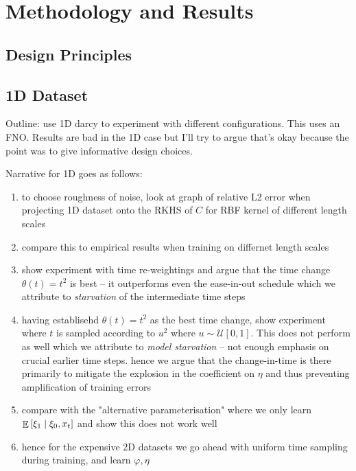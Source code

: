 \chapter{Methodology and Results}\label{cha:4}

\ifpdf
\graphicspath{{Chapter4/Figs/Raster/}{Chapter4/Figs/PDF/}{Chapter4/Figs/}}
\else
\graphicspath{{Chapter4/Figs/Vector/}{Chapter4/Figs/}}
\fi

\section{Design Principles} \label{sec:dp}

\section{1D Dataset} \label{sec:prelim}
Outline: use 1D darcy to experiment with different configurations. This uses an FNO. Results are bad in the 1D case but I'll try to argue that's okay because the point was to give informative design choices.

Narrative for 1D goes as follows:
\begin{enumerate}
  \item to choose roughness of noise, look at graph of relative L2 error when projecting 1D dataset onto the RKHS of \(C\) for RBF kernel of different length scales
  \item compare this to empirical results when training on differnet length scales
  \item show experiment with time re-weightings and argue that the time change \(\theta(t) = t^{2}\) is best -- it outperforms even the ease-in-out schedule which we attribute to \textit{starvation} of the intermediate time steps
  \item having establisehd \(\theta(t) = t^{2}\) as the best time change, show experiment where \(t\) is sampled according to \(u^{2}\) where \(u \sim \mathcal{U}[0, 1]\). This does not perform as well which we attribute to \textit{model starvation} -- not enough emphasis on crucial earlier time steps. hence we argue that the change-in-time is there primarily to mitigate the explosion in the coefficient on \(\eta\) and thus preventing amplification of training errors
  \item compare with the "alternative parameterisation" where we only learn \(\mathop{\mathbb{E}}\qty[\xi_{1} \mid \xi_{0}, x_{t}]\) and show this does not work well
  \item hence for the expensive 2D datasets we go ahead with uniform time sampling during training, and learn \(\varphi, \eta\)
\end{enumerate}
